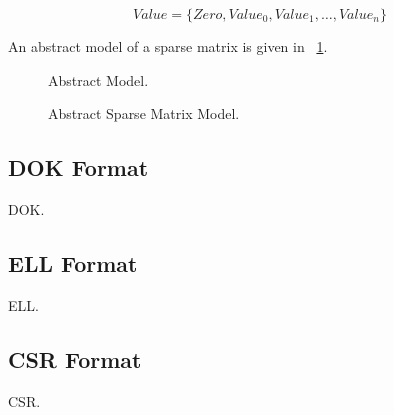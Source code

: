 \documentclass[11pt,conference]{IEEEtran}
\begin{document}
\begin{displaymath}
Value = \{Zero, Value_0, Value_1, \ldots, Value_n\}
\end{displaymath}

An abstract model of a sparse matrix is given in \figurename~\ref{mod:abstract}.

\begin{figure}
\centering
Abstract Model.
\caption{Abstract Sparse Matrix Model.}
\label{mod:abstract}
\end{figure}

\subsection{DOK Format}

DOK.

\subsection{ELL Format}

ELL.

\subsection{CSR Format}

CSR.



\end{document}

